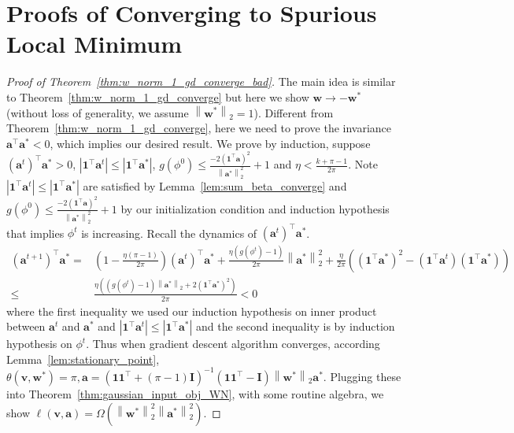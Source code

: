 \documentclass{article}
\newcommand{\firstlayer}{w}
\newcommand{\firstlayerWN}{v}
\newcommand{\secondlayer}{a}
\newcommand{\mat}[1]{\mathbf{#1}}
\newcommand{\vect}[1]{\mathbf{#1}}
\newcommand{\norm}[1]{\left\|#1\right\|}
\newcommand{\abs}[1]{\left|#1\right|}
\begin{document}
\section{Proofs of Converging to Spurious Local Minimum}
\label{sec:proof_local_min}
\begin{proof}[Proof of Theorem~\ref{thm:w_norm_1_gd_converge_bad}]
The main idea is similar to Theorem~\ref{thm:w_norm_1_gd_converge} but here we show $\vect{\firstlayer} \rightarrow -\vect{\firstlayer}^*$ (without loss of generality, we assume $\norm{\vect{\firstlayer}^*}_2 = 1$).
Different from Theorem~\ref{thm:w_norm_1_gd_converge}, here we need to prove the invariance $\vect{\secondlayer}^\top \vect{\secondlayer}^* < 0$, which implies our desired result.
We prove by induction, suppose  $\left(\vect{\secondlayer}^t\right)^\top \vect{\secondlayer}^* > 0$,
$\abs{\vect{1}^\top\vect{\secondlayer}^t} \le \abs{\vect{1}^\top \vect{\secondlayer}^*}$, $g\left(\phi^0\right) \le  \frac{-2\left(\vect{1}^\top\vect{\secondlayer}\right)^2}{\norm{\vect{\secondlayer}^*}_2^2} + 1$ and $\eta < \frac{k+\pi-1}{2\pi}$.
Note $\abs{\vect{1}^\top\vect{\secondlayer}^t} \le \abs{\vect{1}^\top \vect{\secondlayer}^*}$ are satisfied by Lemma~\ref{lem:sum_beta_converge} and $g\left(\phi^0\right) \le  \frac{-2\left(\vect{1}^\top\vect{\secondlayer}\right)^2}{\norm{\vect{\secondlayer}^*}_2^2} + 1$ by our initialization condition and induction hypothesis that implies $\phi^t$ is increasing.
Recall the dynamics of $\left(\vect{\secondlayer}^t\right)^\top \vect{\secondlayer}^*$.
\begin{align*}
\left(\vect{\secondlayer}^{t+1}\right)^\top\vect{\secondlayer}^* = &\left(1-\frac{\eta\left(\pi-1\right)}{2\pi}\right)\left(\vect{\secondlayer}^t\right)^\top \vect{\secondlayer}^*
+ \frac{\eta\left(g\left(\phi^t\right)-1\right)}{2\pi}\norm{\vect{\secondlayer}^*}_2^2
+ \frac{\eta}{2\pi}\left(\left(\vect{1}^\top\vect{\secondlayer}^*\right)^2-\left(\vect{1}^\top\vect{\secondlayer}^t\right)\left(\vect{1}^\top\vect{\secondlayer}^*\right)\right) \\
\le & \frac{\eta\left(\left(g(\phi^t)-1\right)\norm{\vect{\secondlayer}^*}_2+2\left(\vect{1}^\top\vect{\secondlayer}^*\right)^2\right)}{2\pi} < 0
\end{align*}
where the first inequality we used our induction hypothesis on inner product between $\vect{\secondlayer}^t$ and $\vect{\secondlayer}^*$ and $\abs{\vect{1}^\top\vect{\secondlayer}^t} \le \abs{\vect{1}^\top \vect{\secondlayer}^*}$ and the second inequality is by induction hypothesis on $\phi^t$.
Thus when gradient descent algorithm converges, according Lemma~\ref{lem:stationary_point}, $\theta\left(\vect{\firstlayerWN},\vect{\firstlayer}^*\right) = \pi, \vect{\secondlayer} = \left(\vect{1}\vect{1}^\top + \left(\pi-1\right)\mat{I}\right)^{-1}\left(\vect{1}\vect{1}^\top - \mat{I}\right)\norm{\vect{\firstlayer}^*}_2\vect{\secondlayer}^*.$
Plugging these into Theorem~\ref{thm:gaussian_input_obj_WN}, with some routine algebra, we show $\ell\left(\vect{\firstlayerWN},\vect{\secondlayer}\right) = \Omega\left(\norm{\vect{\firstlayer}^*}_2^2\norm{\vect{\secondlayer}^*}_2^2\right)$.
\end{proof}
\end{document}
